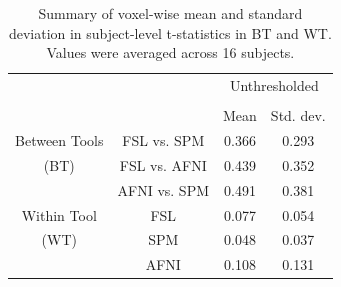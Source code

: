 \documentclass[conference]{IEEEtran}
\begin{document}
\setlength{\tabcolsep}{5pt}
\begin{table}[h]
    \centering
    \begin{tabular}{cccc}
        \toprule
        \multirow{2}{*}{}& {} & \multicolumn{2}{c}{Unthresholded} \\
        \cmidrule{3-4} \\
        {} & {} & Mean & Std. dev. \\
        \midrule
        \rowcolor{lightgray}
        {Between Tools} & FSL vs. SPM        &  0.366       & 0.293     \\
        \rowcolor{lightgray}
        {(BT)} & FSL vs. AFNI                &  0.439       & 0.352     \\
        \rowcolor{lightgray}
        {} & AFNI vs. SPM                    &  0.491       & 0.381     \\
        {Within Tool} & FSL                  &  0.077       & 0.054     \\
        {(WT)}   & SPM                       &  0.048       & 0.037     \\
        {}   & AFNI                          &  0.108       & 0.131     \\
        \bottomrule
    \end{tabular}
    \caption{Summary of voxel-wise mean and standard deviation in subject-level t-statistics in BT and WT. Values were averaged across 16 subjects.}
    \label{table:unthresh-maps-subjects}
\end{table}


\begin{figure}[ht]
\end{figure}
\end{document}
